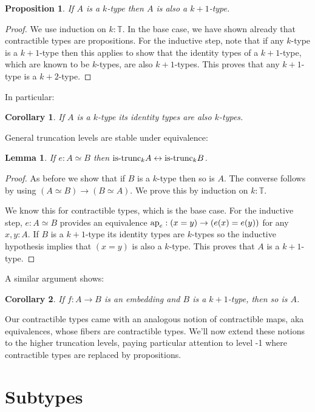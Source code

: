 \documentclass{amsart}
\theoremstyle{theorem}
\newtheorem*{lem}{Lemma}
\newtheorem*{cor}{Corollary}
\newtheorem*{prop}{Proposition}
\theoremstyle{definition}
\theoremstyle{remark}
\newcommand{\0}{\mathbbe{0}}
\newcommand{\1}{\mathbbe{1}}
\newcommand{\2}{\mathbbe{2}}
\newcommand{\3}{\mathbbe{3}}
\newcommand{\4}{\mathbbe{4}}
\newcommand{\term}[1]{{\textup{#1}}}
\newcommand{\type}[1]{{\textup{#1}}}
\newcommand{\bT}{{\mathbb{T}}}
\newcommand{\ap}{\term{ap}}
\newcommand{\is}[1]{\type{is-{#1}}}
\renewcommand{\iff}{\leftrightarrow}
\begin{document}
\begin{prop} If $A$ is a $k$-type then $A$ is also a $k+1$-type.
\end{prop}
\begin{proof}
We use induction on $k : \bT$. In the base case, we have shown already that contractible types are propositions. For the inductive step, note that if any $k$-type is a $k+1$-type then this applies to show that the identity types of a $k+1$-type, which are known to be $k$-types, are also $k+1$-types. This proves that any $k+1$-type is a $k+2$-type.
\end{proof}

In particular:

\begin{cor} If $A$ is a $k$-type its identity types are also $k$-types.
\end{cor}

General truncation levels are stable under equivalence:

\begin{lem} If $e : A \simeq B$ then $\is{trunc}_k A \iff \is{trunc}_kB$.
\end{lem}
\begin{proof}
As before we show that if $B$ is a $k$-type then so is $A$. The converse follows by using $(A \simeq B) \to (B \simeq A)$. We prove this by induction on $k : \bT$.

We know this for contractible types, which is the base case. For the inductive step, $e: A \simeq B$ provides an equivalence $\ap_e :(x=y) \to (e(x)=e(y))$ for any $x,y:A$. If $B$ is a $k+1$-type its identity types are $k$-types so the inductive hypothesis implies that $(x=y)$ is also a $k$-type. This proves that $A$ is a $k+1$-type.
\end{proof}

A similar argument shows:

\begin{cor} If $f \colon A \to B$ is an embedding and $B$ is a $k+1$-type, then so is $A$.
\end{cor}

Our contractible types came with an analogous notion of contractible maps, aka equivalences, whose fibers are contractible types. We'll now extend these notions to the higher truncation levels, paying particular attention to level -1 where contractible types are replaced by propositions.


\section*{Subtypes}
\end{document}
